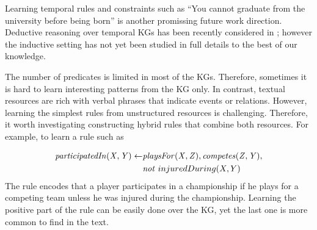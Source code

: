 Learning temporal rules and constraints such as ``You cannot graduate from the university before being born'' is another promissing future work direction. Deductive reasoning over temporal KGs has been recently considered in \cite{DBLP:conf/aaai/ChekolPSS17}; however the inductive setting has not yet been studied in full details to the best of our knowledge.

 The number of predicates is limited in most of the KGs. Therefore, sometimes it is hard to learn interesting patterns from the KG only. In contrast, textual resources are rich with verbal phrases that indicate events or relations. However, learning the simplest rules from unstructured resources is challenging. Therefore, it worth investigating constructing hybrid rules that combine both resources.  For example, to learn a rule such as

\begin{align*}
\mathit{participatedIn(X,Y)} \leftarrow & \mathit{playsFor(X,Z)}, \mathit{competes(Z,Y)},\\ & \mathit{not}~ injuredDuring(X,Y)
\end{align*}
The rule encodes that a player participates in a championship if he plays for a competing team unless he was injured during the championship. Learning the positive part of the rule can be easily done over the KG, yet the last one is more common to find in the text. 





